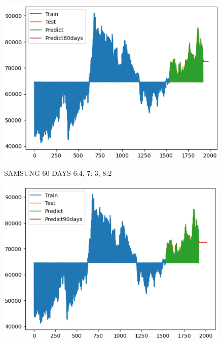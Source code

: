 \documentclass{article}
\begin{document}
\begin{multicols}{2}
\begin{figure}[H]
\begin{minipage}{0.15\textwidth}
    \label{fig:2}
    \end{minipage}%
    \begin{minipage}{0.15\textwidth}
    \centering
    \includegraphics[width=1\textwidth]{Image/XGBoost/SAMSUNG_8_2_60.png}

    \label{fig:3}
    \end{minipage}
    \caption{SAMSUNG 60 DAYS  6:4, 7: 3, 8:2 }
\end{figure}


\begin{figure}[H]
    \centering
    \begin{minipage}{0.15\textwidth}
    \centering
    \includegraphics[width=1\textwidth]{Image/XGBoost/SAMSUNG_6_4_90.png}
   

\end{minipage}
\end{figure}
\end{multicols}
\end{document}
